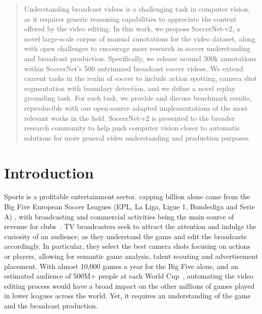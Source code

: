 \documentclass[final]{cvsports}
\begin{document}
\vspace{-1cm}

\begin{abstract}
Understanding broadcast videos is a challenging task in computer vision, as it requires generic reasoning capabilities to appreciate the content offered by the video editing. 
In this work, we propose SoccerNet-v2, a novel large-scale corpus of manual annotations for the \SoccerNet video dataset, along with open challenges to encourage more research in soccer understanding and broadcast production.
Specifically, we release around 300k annotations within SoccerNet's 500 untrimmed broadcast soccer videos. We extend current tasks in the realm of soccer to include action spotting, camera shot segmentation with boundary detection, and we define a novel replay grounding task. For each task, we provide and discuss benchmark results, reproducible with our open-source adapted implementations of the most relevant works in the field.
SoccerNet-v2 is presented to the broader research community to help push computer vision closer to automatic solutions for more general video understanding and production purposes.
\end{abstract} 


\section{Introduction}
\label{sec:Intro}





Sports is a profitable entertainment sector, capping  billion alone came from the Big Five European Soccer Leagues (EPL, La Liga, Ligue 1, Bundesliga and Serie A) \cite{EuropeanFootballMarket,BigFiveMarket1,BigFiveMarket2}, with broadcasting and commercial activities being the main source of revenue for clubs~\cite{BroadcastingRevenue}. 
TV broadcasters seek to attract the attention and indulge the curiosity of an audience, as they understand the game and edit the broadcasts accordingly. In particular, they select the best camera shots focusing on actions or players, allowing for semantic game analysis, talent scouting and advertisement placement. With almost 10,000 games a year for the Big Five alone, and an estimated audience of 500M+ people at each World Cup~\cite{SoccerAudience}, automating the video editing process would have a broad impact on the other millions of games played in lower leagues across the world. Yet, it requires an understanding of the game and the broadcast production.
\end{document}
